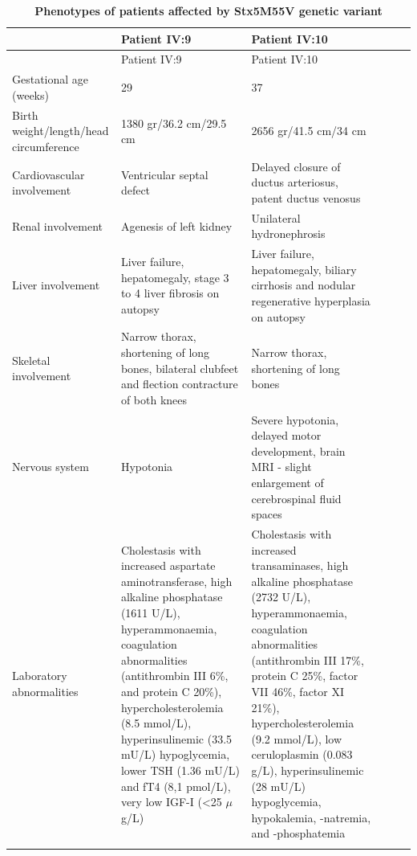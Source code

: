 \footnotesize
\begin{longtable}[c]{C{3cm}C{3cm}C{3cm}c c c}
    \caption{\textbf{Phenotypes of patients affected by Stx5M55V genetic variant}}                                    \\
                          & Patient IV:9                      & Patient IV:10                              \\
    \hline
    \endfirsthead
& Patient IV:9                      & Patient IV:10                              \\
    \hline
    \endhead
    Gestational age (weeks)      & 29           & 37                        \\
    Birth weight/length/head circumference              & 1380 gr/36.2 cm/29.5 cm & 2656 gr/41.5 cm/34 cm     \\
    Cardiovascular involvement                   & Ventricular septal defect                     & Delayed closure of ductus arteriosus, patent ductus venosus                                       \\
    Renal involvement          & Agenesis of left kidney     & Unilateral hydronephrosis                    \\
    Liver involvement                   & Liver failure, hepatomegaly, stage 3 to 4 liver fibrosis on autopsy                     & Liver failure, hepatomegaly, biliary cirrhosis and nodular regenerative hyperplasia on autopsy      \\
    Skeletal involvement                  & Narrow thorax, shortening of long bones, bilateral clubfeet and flection contracture of both knees                      & Narrow thorax, shortening of long bones                         \\
    Nervous system                 & Hypotonia                     & Severe hypotonia, delayed motor development, brain MRI - slight enlargement of cerebrospinal fluid spaces                        \\
    Laboratory abnormalities        & Cholestasis with increased aspartate aminotransferase, high alkaline phosphatase (1611 U/L), hyperammonaemia, coagulation abnormalities (antithrombin III 6\%, and protein C 20\%), hypercholesterolemia (8.5 mmol/L), hyperinsulinemic (33.5 mU/L) hypoglycemia, lower TSH (1.36 mU/L) and fT4 (8,1 pmol/L), very low IGF-I (<25 $\mu$g/L)                   & Cholestasis with increased transaminases, high alkaline phosphatase (2732 U/L), hyperammonaemia, coagulation abnormalities (antithrombin III 17\%, protein C 25\%, factor VII 46\%, factor XI 21\%), hypercholesterolemia (9.2 mmol/L),  low ceruloplasmin (0.083 g/L), hyperinsulinemic (28 mU/L) hypoglycemia, hypokalemia, -natremia, and -phosphatemia                       \\
    \label{tbl:ch6tbl1}
\end{longtable}
\normalsize

